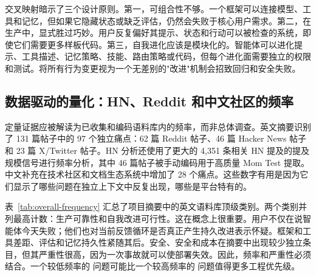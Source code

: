交叉映射暗示了三个设计原则。第一，可组合性不够。一个框架可以连接模型、工具和记忆，但如果它隐藏状态或缺乏评估，仍然会失败于核心用户需求。第二，在生产中，显式胜过巧妙。用户反复偏好其提示、状态和行动可以被检查的系统，即使它们需要更多样板代码。第三，自我进化应该是模块化的。智能体可以进化提示、工具描述、记忆策略、技能、路由策略或代码，但每个进化面需要独立的权限和测试。将所有行为变更视为一个无差别的"改进"机制会招致回归和安全失败。

\subsection{数据驱动的量化：HN、Reddit 和中文社区的频率}
\label{subsec:data-quantification}

定量证据应被解读为已收集和编码语料库内的频率，而非总体调查。英文摘要识别了 131 篇帖子中的 97 个独立痛点：62 篇 Reddit 帖子、46 篇 Hacker News 帖子和 23 篇 X/Twitter 帖子。HN 分析还使用了更大的 4,351 条相关 HN 提及的提及规模信号进行频率分析，其中 46 篇帖子被手动编码用于高质量 Mom Test 提取。中文补充在技术社区和文档生态系统中增加了 28 个痛点。这些数字有用是因为它们显示了哪些问题在独立上下文中反复出现，哪些是平台特有的。

表~\ref{tab:overall-frequency} 汇总了项目摘要中的英文语料库顶级类别。两个类别并列最高计数：生产可靠性和自我改进可行性。这在概念上很重要。用户不仅在说智能体今天失败；他们也对当前反馈循环是否真正产生持久改进表示怀疑。框架和工具差距、评估和记忆持久性紧随其后。安全、安全和成本在摘要中出现较少独立条目，但其严重性很高，因为一次事故就可以使部署失效。因此，频率和严重性必须结合。一个较低频率的 \sevcritical{} 问题可能比一个较高频率的 \sevmedium{} 问题值得更多工程优先级。

